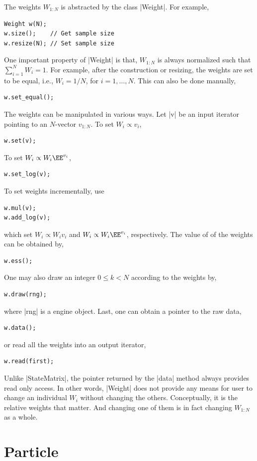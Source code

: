 The weights $W_{1:N}$ is abstracted by the class |Weight|. For example,
\begin{Verbatim}
Weight w(N);
w.size();    // Get sample size
w.resize(N); // Set sample size
\end{Verbatim}
One important property of |Weight| is that, $W_{1:N}$ is always normalized such
that $\sum_{i=1}^N W_i = 1$. For example, after the construction or resizing,
the weights are set to be equal, i.e., $W_i = 1 / N$, for $i = 1,\dots,N$. This
can also be done manually,
\begin{Verbatim}
w.set_equal();
\end{Verbatim}
The weights can be manipulated in various ways. Let |v| be an input iterator
pointing to an $N$-vector $v_{1:N}$. To set $W_i \propto v_i$,
\begin{Verbatim}
w.set(v);
\end{Verbatim}
To set $ W_i \propto W_i\EE^{v_i}$,
\begin{Verbatim}
w.set_log(v);
\end{Verbatim}
To set weights incrementally, use
\begin{Verbatim}
w.mul(v);
w.add_log(v);
\end{Verbatim}
which set $W_i \propto W_iv_i$ and $W_i \propto W_i \EE^{v_i}$, respectively.
The value of \ess of the weights can be obtained by,
\begin{Verbatim}
w.ess();
\end{Verbatim}
One may also draw an integer $0 \le k < N$ according to the weights by,
\begin{Verbatim}
w.draw(rng);
\end{Verbatim}
where |rng| is a \rng engine object. Last, one can obtain a pointer to the raw
data,
\begin{Verbatim}
w.data();
\end{Verbatim}
or read all the weights into an output iterator,
\begin{Verbatim}
w.read(first);
\end{Verbatim}
Unlike |StateMatrix|, the pointer returned by the |data| method always provides
read only access. In other words, |Weight| does not provide any means for user
to change an individual $W_i$ without changing the others. Conceptually, it is
the relative weights that matter. And changing one of them is in fact changing
$W_{1:N}$ as a whole.

\section{Particle}
\label{sec:Particle}

